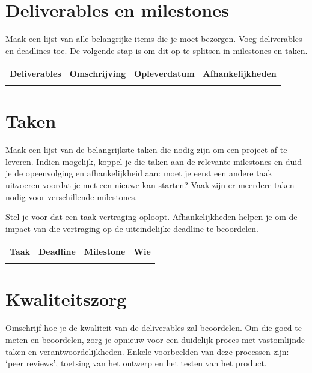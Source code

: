 \documentclass{article}
\begin{document}
\section{Deliverables en milestones}
Maak een lijst van alle belangrijke items die je moet bezorgen. Voeg deliverables en deadlines toe. 
De volgende stap is om dit op te splitsen in milestones en taken. 


\begin{table}[h]
  \begin{tabularx}{\textwidth}{| >{\raggedright\arraybackslash}X | >{\centering\arraybackslash}X | >{\centering\arraybackslash}X | >{\centering\arraybackslash}X |}
  \hline
  Deliverables &  Omschrijving & Opleverdatum  & Afhankelijkheden\\ \hline
   &  &  & \\ \hline
  \end{tabularx}
\end{table}


\section{Taken}
Maak een lijst van de belangrijkste taken die nodig zijn om een project af te leveren. 
Indien mogelijk, koppel je die taken aan de relevante milestones en duid je de opeenvolging en afhankelijkheid aan: 
moet je eerst een andere taak uitvoeren voordat je met een nieuwe kan starten? 
Vaak zijn er meerdere taken nodig voor verschillende milestones.  

Stel je voor dat een taak vertraging oploopt. Afhankelijkheden helpen je om de impact van die vertraging 
op de uiteindelijke deadline te beoordelen. 


\begin{table}[h]
  \begin{tabularx}{\textwidth}{| >{\raggedright\arraybackslash}X | >{\centering\arraybackslash}X | >{\centering\arraybackslash}X | >{\centering\arraybackslash}X |}
  \hline
  Taak &  Deadline & Milestone  & Wie\\ \hline
   &  &  & \\ \hline
  \end{tabularx}
\end{table}


\section{Kwaliteitszorg}
Omschrijf hoe je de kwaliteit van de deliverables zal beoordelen. Om die goed te meten en beoordelen, 
zorg je opnieuw voor een duidelijk proces met vastomlijnde taken en verantwoordelijkheden. 
Enkele voorbeelden van deze processen zijn: ‘peer reviews’, toetsing van het ontwerp en het testen van het product.  
\end{document}
